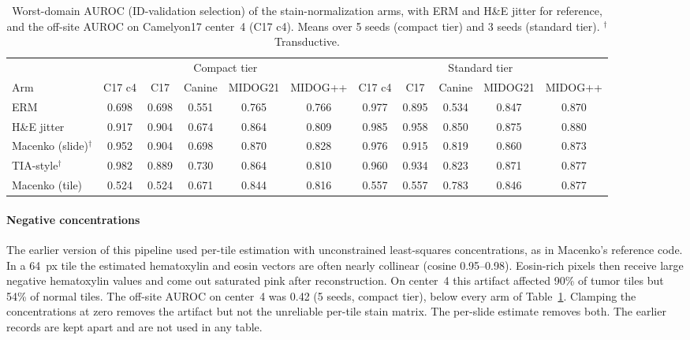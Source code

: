 \begin{table}[width=\linewidth,pos=t]
\caption{Worst-domain AUROC (ID-validation selection) of the stain-normalization
arms, with ERM and H\&E jitter for reference, and the off-site AUROC on
Camelyon17 center~4 (C17 c4). Means over 5 seeds (compact tier) and 3 seeds
(standard tier). $^{\dagger}$Transductive.}
\label{tab:macenko}
\footnotesize
\setlength{\tabcolsep}{3pt}
\begin{tabular*}{\tblwidth}{@{\extracolsep{\fill}}lcccccccccc@{}}
\toprule
 & \multicolumn{5}{c}{Compact tier} & \multicolumn{5}{c}{Standard tier} \\
\cmidrule(lr){2-6}\cmidrule(lr){7-11}
Arm & C17 c4 & C17 & Canine & MIDOG21 & MIDOG++ & C17 c4 & C17 & Canine & MIDOG21 & MIDOG++ \\
\midrule
ERM & 0.698 & 0.698 & 0.551 & 0.765 & 0.766 & 0.977 & 0.895 & 0.534 & 0.847 & 0.870 \\
H\&E jitter & 0.917 & 0.904 & 0.674 & 0.864 & 0.809 & 0.985 & 0.958 & 0.850 & 0.875 & 0.880 \\
Macenko (slide)$^{\dagger}$ & 0.952 & 0.904 & 0.698 & 0.870 & 0.828 & 0.976 & 0.915 & 0.819 & 0.860 & 0.873 \\
TIA-style$^{\dagger}$ & 0.982 & 0.889 & 0.730 & 0.864 & 0.810 & 0.960 & 0.934 & 0.823 & 0.871 & 0.877 \\
Macenko (tile) & 0.524 & 0.524 & 0.671 & 0.844 & 0.816 & 0.557 & 0.557 & 0.783 & 0.846 & 0.877 \\
\bottomrule
\end{tabular*}
\end{table}

\paragraph{Negative concentrations} The earlier version of this pipeline used
per-tile estimation with unconstrained least-squares concentrations, as in
Macenko's reference code. In a 64~px tile the estimated hematoxylin and eosin
vectors are often nearly collinear (cosine 0.95--0.98). Eosin-rich pixels then
receive large negative hematoxylin values and come out saturated pink after
reconstruction. On center~4 this artifact affected 90\% of tumor tiles but
54\% of normal tiles. The off-site AUROC on center~4 was 0.42 (5 seeds, compact
tier), below every arm of Table~\ref{tab:macenko}. Clamping the concentrations at zero removes the
artifact but not the unreliable per-tile stain matrix. The per-slide estimate
removes both. The earlier records are kept apart and are not used in any table.

